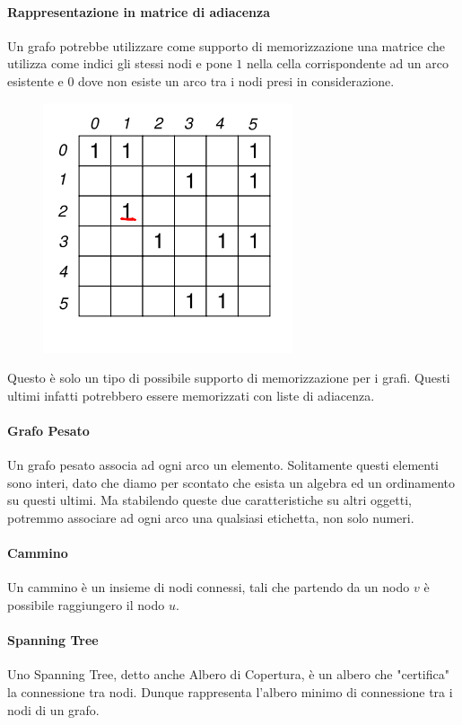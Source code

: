 \documentclass{article}
\begin{document}
\paragraph{Rappresentazione in matrice di adiacenza} Un grafo potrebbe utilizzare come supporto di memorizzazione una matrice che utilizza come indici gli stessi nodi e pone $1$ nella cella corrispondente ad un arco esistente e $0$ dove non esiste un arco tra i nodi presi in considerazione.

\begin{figure}[htbp]
        \center
        \includegraphics[scale=0.55]{img/matriceGrafo.png}
\end{figure}

Questo è solo un tipo di possibile supporto di memorizzazione per i grafi. Questi ultimi infatti potrebbero essere memorizzati con liste di adiacenza.

\paragraph{Grafo Pesato} Un grafo pesato associa ad ogni arco un elemento. Solitamente questi elementi sono interi, dato che diamo per scontato che esista un algebra ed un ordinamento su questi ultimi. Ma stabilendo queste due caratteristiche su altri oggetti, potremmo associare ad ogni arco una qualsiasi etichetta, non solo numeri.

\paragraph{Cammino} Un cammino è un insieme di nodi connessi, tali che partendo da un nodo $v$ è possibile raggiungero il nodo $u$.

\paragraph{Spanning Tree} Uno Spanning Tree, detto anche Albero di Copertura, è un albero che "certifica" la connessione tra nodi. Dunque rappresenta l'albero minimo di connessione tra i nodi di un grafo.
\end{document}
